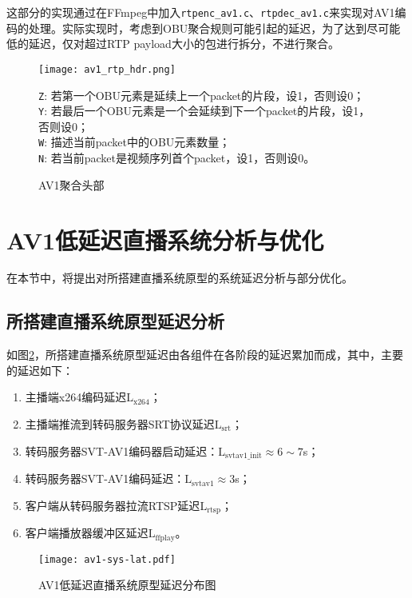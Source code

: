 	这部分的实现通过在FFmpeg中加入\texttt{rtpenc\_av1.c}、\texttt{rtpdec\_av1.c}来实现对AV1编码的处理。实际实现时，考虑到OBU聚合规则可能引起的延迟，为了达到尽可能低的延迟，仅对超过RTP payload大小的包进行拆分，不进行聚合。

	\begin{figure}[!htp]
		\centering
		\texttt{[image: av1\_rtp\_hdr.png]} \\
		\raggedright
		\footnotesize\qquad\qquad\texttt{Z}: 若第一个OBU元素是延续上一个packet的片段，设1，否则设0；\\
		\qquad\qquad\texttt{Y}: 若最后一个OBU元素是一个会延续到下一个packet的片段，设1，否则设0；\\
		\qquad\qquad\texttt{W}: 描述当前packet中的OBU元素数量；\\
		\qquad\qquad\texttt{N}: 若当前packet是视频序列首个packet，设1，否则设0。\\
		\caption{AV1聚合头部}
		\label{fig:av1rtp-aggr}
	\end{figure}
\section{AV1低延迟直播系统分析与优化}

在本节中，将提出对所搭建直播系统原型的系统延迟分析与部分优化。

\subsection{所搭建直播系统原型延迟分析\label{sec:latency-analysis}}
	如图\ref{fig:av1-sys-lat}，所搭建直播系统原型延迟由各组件在各阶段的延迟累加而成，其中，主要的延迟如下：
	\begin{enumerate} [label=\arabic*)]
		\item 主播端x264编码延迟$\mathrm{L_{x264}}$；
		\item 主播端推流到转码服务器SRT协议延迟$\mathrm{L_{srt}}$；
		\item 转码服务器SVT-AV1编码器启动延迟：$\mathrm{L_{svtav1\_init}}\approx6\sim 7$s；
		\item 转码服务器SVT-AV1编码延迟：$\mathrm{L_{svtav1}}\approx 3$s；
		\item 客户端从转码服务器拉流RTSP延迟$\mathrm{L_{rtsp}}$；
		\item 客户端播放器缓冲区延迟$\mathrm{L_{ffplay}}$。
	\end{enumerate}

  \begin{figure}[!htp]
		\centering
		\texttt{[image: av1-sys-lat.pdf]}
		\caption{AV1低延迟直播系统原型延迟分布图}
		\label{fig:av1-sys-lat}
	\end{figure}

